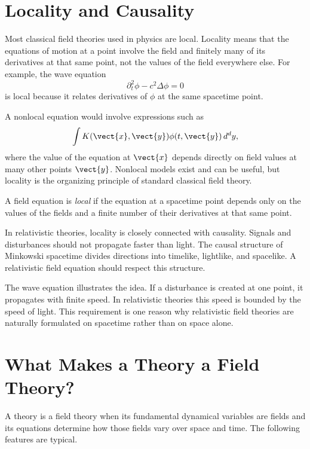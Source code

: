 \section{Locality and Causality}

Most classical field theories used in physics are local. Locality means that the
equations of motion at a point involve the field and finitely many of its
derivatives at that same point, not the values of the field everywhere else.
For example, the wave equation
\[
    \partial_t^2\phi - c^2\Delta\phi = 0
\]
is local because it relates derivatives of \(\phi\) at the same spacetime point.

A nonlocal equation would involve expressions such as
\[
    \int K(\vect{x},\vect{y})\phi(t,\vect{y})\,d^d y,
\]
where the value of the equation at \(\vect{x}\) depends directly on field values
at many other points \(\vect{y}\). Nonlocal models exist and can be useful, but
locality is the organizing principle of standard classical field theory.

\begin{definitionbox}
A field equation is \emph{local} if the equation at a spacetime point depends
only on the values of the fields and a finite number of their derivatives at
that same point.
\end{definitionbox}

In relativistic theories, locality is closely connected with causality. Signals
and disturbances should not propagate faster than light. The causal structure of
Minkowski spacetime divides directions into timelike, lightlike, and spacelike.
A relativistic field equation should respect this structure.

The wave equation illustrates the idea. If a disturbance is created at one
point, it propagates with finite speed. In relativistic theories this speed is
bounded by the speed of light. This requirement is one reason why relativistic
field theories are naturally formulated on spacetime rather than on space alone.

\section{What Makes a Theory a Field Theory?}

A theory is a field theory when its fundamental dynamical variables are fields
and its equations determine how those fields vary over space and time. The
following features are typical.

